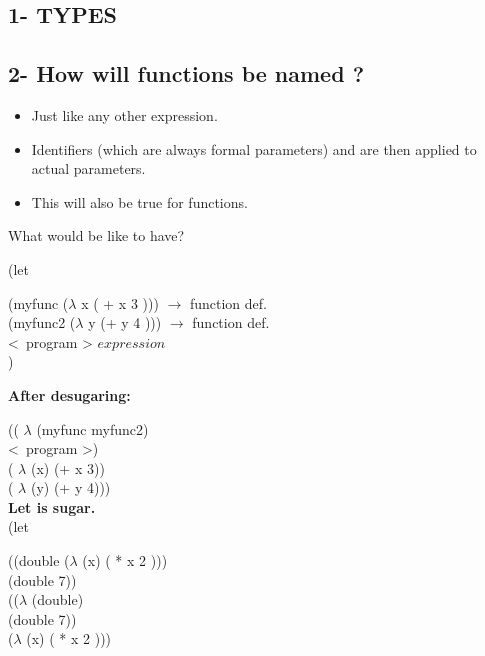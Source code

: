 \documentclass{article}
\begin{document}
\subsection*{1- TYPES}
\subsection*{2- How will functions be named ?}
\begin{flushleft}
\begin{itemize}
\item Just like any other expression.
\item Identifiers (which are always formal parameters) and are then applied to actual parameters.
\item This will also be true for functions.
\end{itemize}
\doublespacing
What would be like to have?

(let
   
  \hspace{0.5cm}(myfunc ($\lambda$ x ( + x 3 ))) $\rightarrow$ function def.\\ 
  \hspace{0.5cm}(myfunc2 ($\lambda$ y (+ y 4 ))) $\rightarrow$ function def.\\ 
  \hspace{0.5cm}\textless\ program \textgreater {} $expression$
\\)


\textbf{After desugaring:}

((  $\lambda$ (myfunc myfunc2)\\
\textless\ program \textgreater)\\
\hspace{0.5cm}( $\lambda$ (x) (+ x 3))\\
\hspace{0.5cm}( $\lambda$ (y) (+ y 4)))\\
\textbf{Let is sugar.}\\

(let
   
  \hspace{0.5cm}((double ($\lambda$ (x) ( * x 2 )))\\
  \hspace{0.5cm}(double 7))\\
   
(($\lambda$ (double)\\
\hspace{0.5cm}(double 7))\\
\hspace{0.5cm}($\lambda$ (x) ( * x 2 )))\\
\doublespacing


\end{flushleft}
\end{document}
